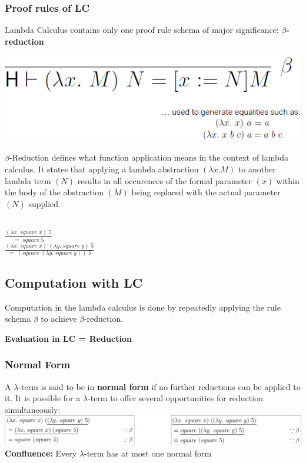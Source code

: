 \subsubsection{Proof rules of LC}
Lambda Calculus contains only one proof rule schema of major significance: \textbf{$\beta$-reduction}\\ 
\begin{center}
    \includegraphics[width=0.8\linewidth]{img/lc_beta.png}
\end{center}
$\beta$-Reduction defines what function application means in the context of lambda calculus. 
It states that applying a lambda abstraction $(\lambda x.M)$ to another lambda term $(N)$ results in all occurences of the formal parameter $(x)$ within the body of the abstraction $(M)$ being replaced with the actual parameter $(N)$ supplied.\\\\ 
\begin{center}
    $\frac{(\lambda x. \; square \; x)\; 5}{=\; square \; 5}$\\
    \vspace{0.5cm}
    $\frac{(\lambda x. \; square \; x) \: (\lambda y. \; square \; y) \; 5}{= \; (square \; (\lambda y. \; square \; y)) \; 5}$
\end{center}

\subsection{Computation with LC}
Computation in the lambda calculus is done by repeatedly applying the rule schema $\beta$ to achieve $\beta$-reduction.\\ 
\begin{center}
    \textbf{Evaluation in LC = Reduction}
\end{center}

\subsubsection{Normal Form}
A $\lambda$-term is said to be in \textbf{normal form} if no further reductions can be applied to it.
It is possible for a $\lambda$-term to offer several opportunities for reduction simultaneously:
\includegraphics[width=\linewidth]{img/lc_reduction.png}
\textbf{Confluence:} Every $\lambda$-term has at most one normal form

